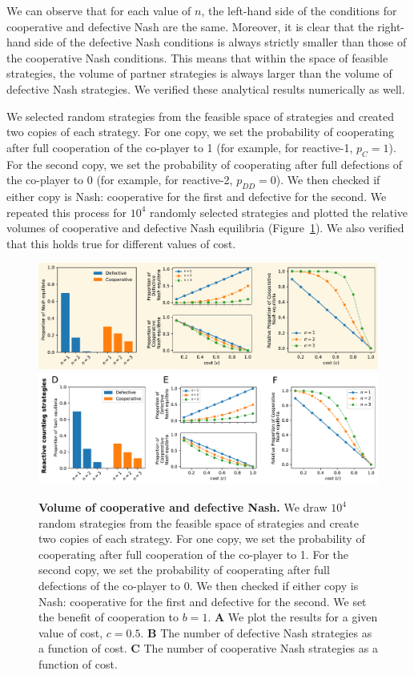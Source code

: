 \documentclass[11pt]{article}
\theoremstyle{plainCl1}
\theoremstyle{plainCl2}
\begin{document}
\noindent
We can observe that for each value of \(n\), the left-hand side of the
conditions for cooperative and defective Nash are the same. Moreover, it is
clear that the right-hand side of the defective Nash conditions is always
strictly smaller than those of the cooperative Nash conditions. This means that
within the space of feasible strategies, the volume of partner strategies is
always larger than the volume of defective Nash strategies. We verified these
analytical results numerically as well.

We selected random strategies from the feasible space of strategies and created
two copies of each strategy. For one copy, we set the probability of cooperating
after full cooperation of the co-player to 1 (for example, for reactive-1, \(p_{C} = 1\)). 
For the second copy, we set the probability of cooperating after
full defections of the co-player to 0 (for example, for reactive-2, \(p_{DD} =
0\)). We then checked if either copy is Nash: cooperative for the first and
defective for the second. We repeated this process for \(10^4\) randomly
selected strategies and plotted the relative volumes of cooperative and
defective Nash equilibria (Figure~\ref{fig:reactive_volume}). We also verified
that this holds true for different values of cost.

\begin{figure}[t]
  \centering
  \includegraphics[width=\textwidth]{../../figures/siFig1.pdf}
  \includegraphics[width=\textwidth]{../../figures/siFig1Counting.pdf}
  \caption{
  \textbf{Volume of cooperative and defective Nash.}
We draw \(10^4\) random
strategies from the feasible space of strategies and create two copies of each
strategy. For one copy, we set the probability of cooperating after full
cooperation of the co-player to 1. For the second copy, we set the probability
of cooperating after full defections of the co-player to 0. We then checked if
either copy is Nash: cooperative for the first and defective for the second. We
set the benefit of cooperation to \(b = 1\). 
{\bf A} We plot the results for a given value of cost, \(c = 0.5\).
{\bf B} The number of defective Nash strategies as a function of cost.
{\bf C} The number of cooperative Nash strategies as a function of cost.
}\label{fig:reactive_volume}
\end{figure}
\end{document}
